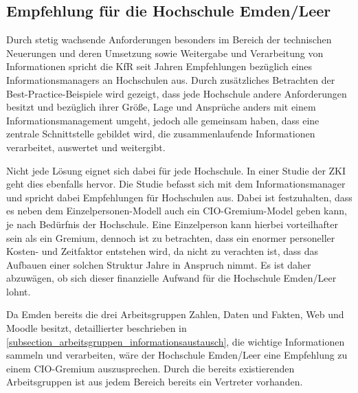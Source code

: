 \subsection{Empfehlung für die Hochschule Emden/Leer}
\label{empfehlung_cio}

Durch stetig wachsende Anforderungen besonders im Bereich der technischen Neuerungen und deren Umsetzung sowie Weitergabe und Verarbeitung von Informationen spricht die KfR seit Jahren Empfehlungen bezüglich eines Informationsmanagers an Hochschulen aus. Durch zusätzliches Betrachten der Best-Practice-Beispiele wird gezeigt, dass jede Hochschule andere Anforderungen besitzt und bezüglich ihrer Größe, Lage und Ansprüche anders mit einem Informationsmanagement umgeht, jedoch alle gemeinsam haben, dass eine zentrale Schnittstelle gebildet wird, die zusammenlaufende Informationen verarbeitet, auswertet und weitergibt.

Nicht jede Lösung eignet sich dabei für jede Hochschule. In einer Studie der ZKI geht dies ebenfalls hervor. Die Studie befasst sich mit dem Informationsmanager und spricht dabei Empfehlungen für Hochschulen aus. Dabei ist festzuhalten, dass es neben dem Einzelpersonen-Modell auch ein CIO-Gremium-Model geben kann, je nach Bedürfnis der Hochschule. Eine Einzelperson kann hierbei vorteilhafter sein als ein Gremium, dennoch ist zu betrachten, dass ein enormer personeller Kosten- und Zeitfaktor entstehen wird, da nicht zu verachten ist, dass das Aufbauen einer solchen Struktur Jahre in Anspruch nimmt. Es ist daher abzuwägen, ob sich dieser finanzielle Aufwand für die Hochschule Emden/Leer lohnt.

Da Emden bereits die drei Arbeitsgruppen Zahlen, Daten und Fakten, Web und Moodle besitzt, detaillierter beschrieben in \ref{subsection_arbeitsgruppen_informationsaustausch}, die wichtige Informationen sammeln und verarbeiten, wäre der Hochschule Emden/Leer eine Empfehlung zu einem CIO-Gremium auszusprechen. Durch die bereits existierenden Arbeitsgruppen ist aus jedem Bereich bereits ein Vertreter vorhanden. 

